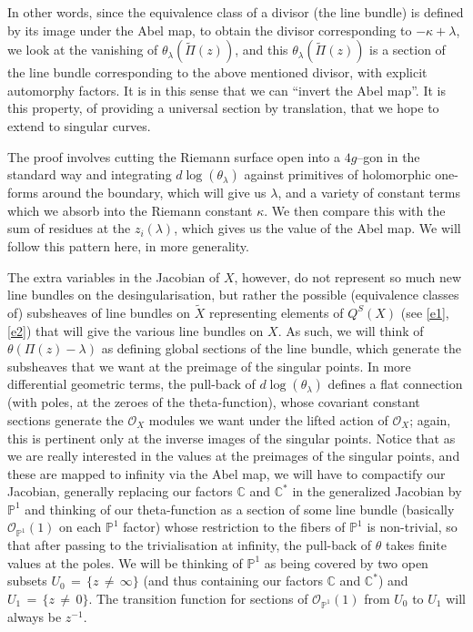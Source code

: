 \documentclass[12pt,reqno]{amsart}
\numberwithin{equation}{section}
\theoremstyle{definition}
\theoremstyle{remark}
\def\bC{{\mathbb {C}}}
\def\bP{{\mathbb {P}}}
\def\pO{{\mathcal O}}
\begin{document}
In other words, since the equivalence class of a divisor (the line bundle) is defined by its image under 
the Abel map, to obtain the divisor corresponding to $-\kappa+\lambda$, we look at the vanishing of 
$\theta_\lambda( \widetilde \Pi(z))$, and this $\theta_\lambda(\widetilde \Pi(z))$ is a section of the line 
bundle corresponding to the above mentioned divisor, with explicit automorphy factors. It is in this
sense that we can 
``invert the Abel map''.  It is this property, of providing a universal section by translation, that we 
hope to extend to singular curves.

The proof involves cutting the Riemann surface open into a $4g$--gon in the standard way and integrating 
$d\log (\theta_\lambda)$ against primitives of holomorphic one-forms around the boundary, which will give us 
$\lambda$, and a variety of constant terms which we absorb into the Riemann constant $\kappa$. We then 
compare this with the sum of residues at the $z_i(\lambda)$, which gives us the value of the Abel map. We 
will follow this pattern here, in more generality.

The extra variables in the Jacobian of $X$, however, do not represent so much new line bundles on the 
desingularisation, but rather the possible (equivalence classes of) subsheaves of line bundles on 
$\widetilde X$ representing elements of $Q^S(X)$ (see \eqref{e1}, \eqref{e2})
that will give the various line bundles on $X$. As such, 
we will think of $\theta(\Pi(z) -\lambda)$ as defining global sections of the line bundle, which generate 
the subsheaves  that we want at the preimage of the singular points. In more differential geometric terms, 
the pull-back of $d\log (\theta_\lambda)$ defines a flat connection (with poles, at the zeroes of the 
theta-function), whose covariant constant sections generate the $\pO_X$ modules we want under the lifted 
action of $\pO_X$; again, this is pertinent only at the inverse images of the singular points. Notice that 
as we are really interested in the values at the preimages of the singular points, and these are mapped to 
infinity via the Abel map, we will have to compactify our Jacobian, generally replacing our factors $\bC$ 
and $\bC^*$ in the generalized Jacobian by $\bP^1$ and thinking of our theta-function as a section of some 
line bundle (basically ${\pO}_{\bP^1}(1)$ on each $\bP^1$ factor) whose restriction to the fibers of $\bP^1$ is 
non-trivial, so that after passing to the trivialisation at infinity, the pull-back of $\theta$ takes 
finite values at the poles. We will be thinking of $\bP^1$ as being covered by two open
subsets $U_0\,=\, \{z\,\neq\, \infty\}$ (and thus containing our factors $\bC$ and $\bC^*$) and $U_1
\,=\, \{z\,\neq\, 0\}$. The transition 
function for sections of $\pO_{\bP^1}(1)$ from $U_0$ to $U_1$ will always be $z^{-1}$.
\end{document}
